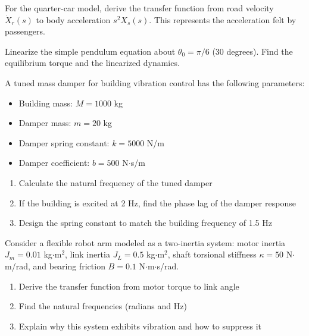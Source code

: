 \begin{exercise}
For the quarter-car model, derive the transfer function from road velocity $\dot{X}_r(s)$ to body acceleration $s^2 X_s(s)$. This represents the acceleration felt by passengers.
\end{exercise}

\begin{exercise}
Linearize the simple pendulum equation about $\theta_0 = \pi/6$ (30 degrees). Find the equilibrium torque and the linearized dynamics.
\end{exercise}

\begin{exercise}
A tuned mass damper for building vibration control has the following parameters:
\begin{itemize}
    \item Building mass: $M = 1000$ kg
    \item Damper mass: $m = 20$ kg
    \item Damper spring constant: $k = 5000$ N/m
    \item Damper coefficient: $b = 500$ N$\cdot$s/m
\end{itemize}

\begin{enumerate}[label=(\alph*)]
    \item Calculate the natural frequency of the tuned damper
    \item If the building is excited at 2 Hz, find the phase lag of the damper response
    \item Design the spring constant to match the building frequency of 1.5 Hz
\end{enumerate}
\end{exercise}

\begin{exercise}
Consider a flexible robot arm modeled as a two-inertia system: motor inertia $J_m = 0.01$ kg$\cdot$m$^2$, link inertia $J_L = 0.5$ kg$\cdot$m$^2$, shaft torsional stiffness $\kappa = 50$ N$\cdot$m/rad, and bearing friction $B = 0.1$ N$\cdot$m$\cdot$s/rad.

\begin{enumerate}[label=(\alph*)]
    \item Derive the transfer function from motor torque to link angle
    \item Find the natural frequencies (radians and Hz)
    \item Explain why this system exhibits vibration and how to suppress it
\end{enumerate}
\end{exercise}

